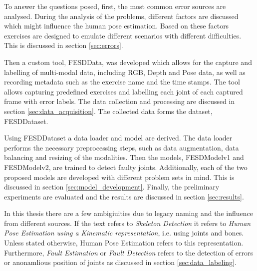 To answer the questions posed, first, the most common error sources are analysed. During the analysis of the problems, different factors are discussed which might influence the human pose estimation. Based on these factors exercises are designed to emulate different scenarios with different difficulties. This is discussed in section \ref{sec:errors}.

Then a custom tool, FESDData, was developed which allows for the capture and labelling of multi-modal data, including RGB, Depth and Pose data, as well as recording metadata such as the exercise name and the time stamps. The tool allows capturing predefined exercises and labelling each joint of each captured frame with error labels. The data collection and processing are discussed in section \ref{sec:data_acquisition}. The collected data forms the dataset, FESDDataset.

Using FESDDataset a data loader and model are derived. The data loader performs the necessary preprocessing steps, such as data augmentation, data balancing and resizing of the modalities. Then the models, FESDModelv1 and FESDModelv2, are trained to detect faulty joints. Additionally, each of the two proposed models are developed with different problem sets in mind. This is discussed in section \ref{sec:model_development}. Finally, the preliminary experiments are evaluated and the results are discussed in section \ref{sec:results}.

In this thesis there are a few ambigiuities due to legacy naming and the influence from different sources. If the text refers to \textit{Skeleton Detection} it refers to \textit{Human Pose Estimation using a Kinematic representation}, i.e. using joints and bones. Unless stated otherwise, Human Pose Estimation refers to this representation. Furthermore, \textit{Fault Estimation} or \textit{Fault Detection} refers to the detection of errors or anonamlious position of joints as discussed in section \ref{sec:data_labeling}.